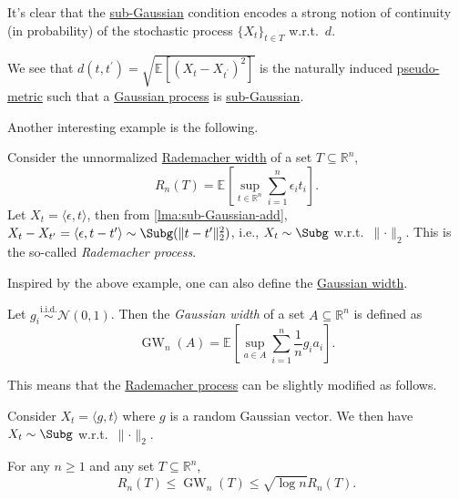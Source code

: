It's clear that the \hyperref[def:sub-Gaussian-process]{sub-Gaussian} condition encodes a strong notion of continuity (in probability) of the stochastic process \(\{ X_t \} _{t\in T}\) w.r.t.\ \(d\).

\begin{eg}
	We see that \(d(t, t^{\prime} ) = \sqrt{\mathbb{E}_{}\left[ (X_t - X_{t^{\prime} })^2 \right]}\) is the naturally induced \hyperref[def:pseudo-metric]{pseudo-metric} such that a \hyperref[def:Gaussian-process]{Gaussian process} is \hyperref[def:sub-Gaussian-process]{sub-Gaussian}.
\end{eg}

Another interesting example is the following.

\begin{eg}\label{eg:Rademacher-process}
	Consider the unnormalized \hyperref[def:Rademacher-width]{Rademacher width} of a set \(T \subseteq \mathbb{R} ^n\),
	\[
		R_n(T) = \mathbb{E}_{}\left[\sup _{t\in \mathbb{R} ^n} \sum_{i=1}^{n} \epsilon _i t_i \right] .
	\]
	Let \(X_t = \langle \epsilon , t \rangle \), then from \autoref{lma:sub-Gaussian-add}, \(X_t - X_{t^{\prime} } = \langle \epsilon , t-t^{\prime}  \rangle \sim \Subg(\lVert t - t^{\prime}  \rVert_2^2 )\), i.e., \(X_t \sim \Subg\) w.r.t.\ \(\lVert \cdot \rVert _2\). This is the so-called \emph{Rademacher process}.
\end{eg}

Inspired by the above example, one can also define the \hyperref[def:Gaussian-width]{Gaussian width}.

\begin{definition}\label{def:Gaussian-width}
	Let \(g_i \overset{\text{i.i.d.} }{\sim } \mathcal{N} (0, 1)\). Then the \emph{Gaussian width} of a set \(A \subseteq \mathbb{R} ^n\) is defined as
	\[
		\mathop{\mathrm{GW}}\nolimits_n(A) = \mathbb{E}_{}\left[\sup _{a\in A} \sum_{i=1}^{n} \frac{1}{n} g_i a_i \right].
	\]
\end{definition}

This means that the \hyperref[eg:Rademacher-process]{Rademacher process} can be slightly modified as follows.

\begin{eg}
	Consider \(X_t = \langle g, t \rangle \) where \(g\) is a random Gaussian vector. We then have \(X_t \sim \Subg\) w.r.t.\ \(\lVert \cdot \rVert _2\).
\end{eg}

\begin{theorem}
	For any \(n \geq 1\) and any set \(T \subseteq \mathbb{R} ^n\),
	\[
		R_n(T) \leq \mathop{\mathrm{GW}}\nolimits_n(T) \leq \sqrt{\log n} R_n(T).
	\]
\end{theorem}

